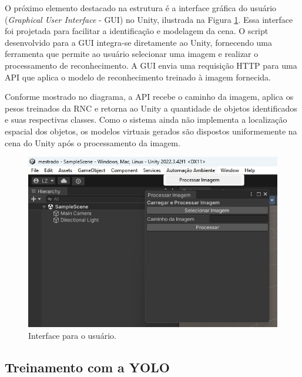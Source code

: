 O próximo elemento destacado na estrutura é a interface gráfica do usuário (\textit{Graphical User Interface} - GUI) no Unity, ilustrada na Figura \ref{fig:GUI}. Essa interface foi projetada para facilitar a identificação e modelagem da cena. O script desenvolvido para a GUI integra-se diretamente ao Unity, fornecendo uma ferramenta que permite ao usuário selecionar uma imagem e realizar o processamento de reconhecimento. A GUI envia uma requisição HTTP para uma API que aplica o modelo de reconhecimento treinado à imagem fornecida.

Conforme mostrado no diagrama, a API recebe o caminho da imagem, aplica os pesos treinados da RNC e retorna ao Unity a quantidade de objetos identificados e suas respectivas classes. Como o sistema ainda não implementa a localização espacial dos objetos, os modelos virtuais gerados são dispostos uniformemente na cena do Unity após o processamento da imagem.

\begin{figure}[!h]
    \centering
    \begin{minipage}{0.49\linewidth}
        \centering
        \captionsetup{justification=centering,margin=0.5cm,font=small}
        \includegraphics[width=\linewidth]{img/cap5/GUI-TOOL.jpeg}
        \caption{Interface para o usuário.}
        \label{fig:GUI}
    \end{minipage}
\end{figure}

\subsection{Treinamento com a YOLO}

